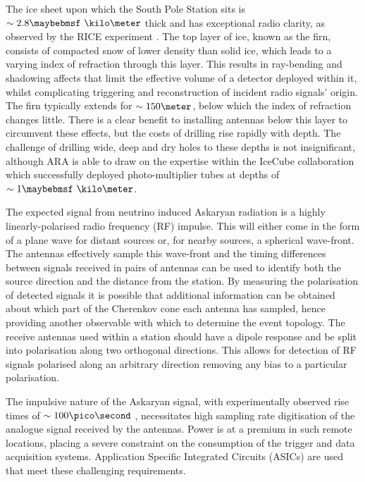 The ice sheet upon which the South Pole Station sits is $\sim 2.8 \km$ thick and has exceptional radio clarity, as observed by the RICE experiment \cite{2004JGlac..50..522K}. The top layer of ice, known as the firn, consists of compacted snow of lower density than solid ice, which leads to a varying index of refraction through this layer. This results in ray-bending and shadowing affects that limit the effective volume of a detector deployed within it, whilst complicating triggering and reconstruction of incident radio signals' origin. The firn typically extends for $\sim 150 \meter$, below which the index of refraction changes little. There is a clear benefit to installing antennas below this layer to circumvent these effects, but the costs of drilling rise rapidly with depth. The challenge of drilling wide, deep and dry holes to these depths is not insignificant, although ARA is able to draw on the expertise within the IceCube collaboration which successfully deployed photo-multiplier tubes at depths of $\sim 1 \km$.


The expected signal from neutrino induced Askaryan radiation is a highly linearly-polarised radio frequency (RF) impulse. This will either come in the form of a plane wave for distant sources or, for nearby sources, a spherical wave-front. The antennas effectively sample this wave-front and the timing differences between signals received in pairs of antennas can be used to identify both the source direction and the distance from the station. By measuring the polarisation of detected signals it is possible that additional information can be obtained about which part of the Cherenkov cone each antenna has sampled, hence providing another observable with which to determine the event topology. The receive antennas used within a station should have a dipole response and be split into polarisation along two orthogonal directions. This allows for detection of RF signals polarised along an arbitrary direction removing any bias to a particular polarisation.

The impulsive nature of the Askaryan signal, with experimentally observed rise times of $\sim 100 \pico \second$ \cite{PhysRevLett.86.2802}, necessitates high sampling rate digitisation of the analogue signal received by the antennas. Power is at a premium in such remote locations, placing a severe constraint on the consumption of the trigger and data acquisition systems. Application Specific Integrated Circuits (ASICs) are used that meet these challenging requirements.



